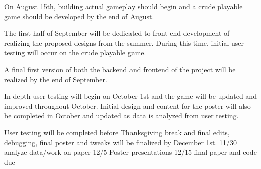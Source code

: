 \documentclass[10pt,twocolumn]{article}
\begin{document}
On August 15th, building actual gameplay should begin and a crude playable game should be developed by the end of August. 

The first half of September will be dedicated to front end development of realizing the proposed designs from the summer. During this time, initial user testing will occur on the crude playable game. 

A final first version of both the backend and frontend of the project will be realized by the end of September. 

In depth user testing will begin on October 1st and the game will be updated and improved throughout October.  Initial design and content for the poster will also be completed in October and updated as data is analyzed from user testing. 

User testing will be completed before Thanksgiving break and final edits, debugging, final poster and tweaks will be finalized by December 1st. 
11/30 analyze data/work on paper  
12/5 Poster presentations
12/15 final paper and code due


\printbibliography 
\end{document}
